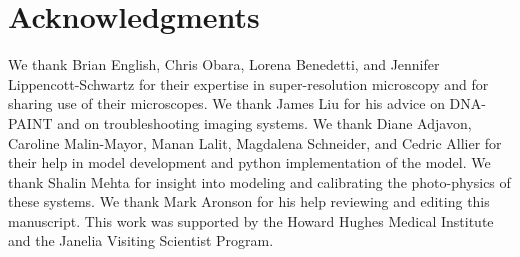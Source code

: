 \section{Acknowledgments}
We thank Brian English, Chris Obara, Lorena Benedetti, and Jennifer Lippencott-Schwartz for their expertise in
    super-resolution microscopy and for sharing use of their microscopes. 
    We thank James Liu for his advice on DNA-PAINT and on troubleshooting imaging systems.
    We thank Diane Adjavon, Caroline Malin-Mayor, Manan Lalit, Magdalena Schneider, and Cedric Allier 
    for their help in model development and python implementation of the model. 
    We thank Shalin Mehta for insight into modeling and calibrating the photo-physics of these systems.
    We thank Mark Aronson for his help reviewing and editing this manuscript. 
    This work was supported by the Howard Hughes Medical Institute and the Janelia Visiting Scientist Program.
